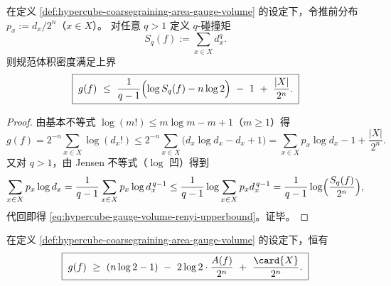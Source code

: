 \begin{proposition}\label{prop:hypercube-gauge-volume-renyi-upperbound}
在定义 \ref{def:hypercube-coarsegraining-area-gauge-volume} 的设定下，令推前分布 \(p_x:=d_x/2^n\)（\(x\in X\)）。
对任意 \(q>1\) 定义 \(q\)-碰撞矩
\[
S_q(f):=\sum_{x\in X} d_x^q.
\]
则规范体积密度满足上界
\begin{equation}\label{eq:hypercube-gauge-volume-renyi-upperbound}
\boxed{\;
g(f)\ \le\ \frac{1}{q-1}\Bigl(\log S_q(f)-n\log 2\Bigr)\ -\ 1\ +\ \frac{|X|}{2^n}.\;}
\end{equation}
\end{proposition}
\begin{proof}
由基本不等式 \(\log(m!)\le m\log m-m+1\)（\(m\ge 1\)）得
\[
g(f)=2^{-n}\sum_{x\in X}\log(d_x!)
\le 2^{-n}\sum_{x\in X}\bigl(d_x\log d_x-d_x+1\bigr)
=\sum_{x\in X}p_x\log d_x-1+\frac{|X|}{2^n}.
\]
又对 \(q>1\)，由 Jensen 不等式（\(\log\) 凹）得到
\[
\sum_{x\in X}p_x\log d_x
=\frac{1}{q-1}\sum_{x\in X}p_x\log d_x^{\,q-1}
\le \frac{1}{q-1}\log\sum_{x\in X}p_x d_x^{\,q-1}
=\frac{1}{q-1}\log\Bigl(\frac{S_q(f)}{2^n}\Bigr),
\]
代回即得 \eqref{eq:hypercube-gauge-volume-renyi-upperbound}。证毕。
\end{proof}

\begin{proposition}\label{prop:hypercube-discrete-holographic-stokes-gauge-area}
在定义 \ref{def:hypercube-coarsegraining-area-gauge-volume} 的设定下，恒有
\[
\boxed{\;
g(f)\ \ge\ (n\log 2-1)\ -\ 2\log 2\cdot\frac{A(f)}{2^n}\ +\ \frac{\card{X}}{2^n}.
\;}
\]
\end{proposition}

